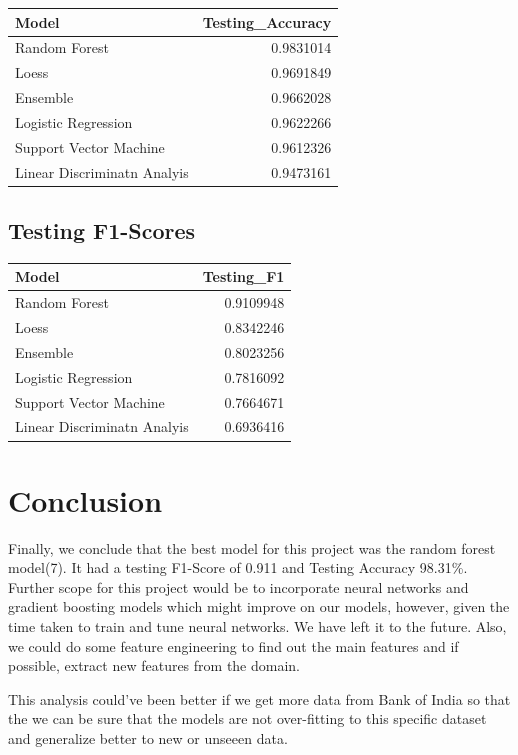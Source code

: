 \documentclass[
]{article}
\newenvironment{Shaded}{\begin{snugshade}}{\end{snugshade}}
\newcommand{\CommentTok}[1]{\textcolor[rgb]{0.00,0.40,1.00}{\textbf{\textit{#1}}}}
\newcommand{\DataTypeTok}[1]{\textcolor[rgb]{0.74,0.68,0.62}{\underline{#1}}}
\newcommand{\KeywordTok}[1]{\textcolor[rgb]{0.26,0.66,0.93}{\textbf{#1}}}
\newcommand{\NormalTok}[1]{\textcolor[rgb]{0.74,0.68,0.62}{#1}}
\newcommand{\OperatorTok}[1]{\textcolor[rgb]{0.74,0.68,0.62}{#1}}
\newcommand{\StringTok}[1]{\textcolor[rgb]{0.02,0.61,0.04}{#1}}
\begin{document}
\begin{longtable}[]{@{}lr@{}}
\toprule
Model & Testing\_Accuracy\tabularnewline
\midrule
\endhead
Random Forest & 0.9831014\tabularnewline
Loess & 0.9691849\tabularnewline
Ensemble & 0.9662028\tabularnewline
Logistic Regression & 0.9622266\tabularnewline
Support Vector Machine & 0.9612326\tabularnewline
Linear Discriminatn Analyis & 0.9473161\tabularnewline
\bottomrule
\end{longtable}

\hypertarget{testing-f1-scores}{%
\subsection{Testing F1-Scores}\label{testing-f1-scores}}

\begin{Shaded}
\end{Shaded}

\begin{longtable}[]{@{}lr@{}}
\toprule
Model & Testing\_F1\tabularnewline
\midrule
\endhead
Random Forest & 0.9109948\tabularnewline
Loess & 0.8342246\tabularnewline
Ensemble & 0.8023256\tabularnewline
Logistic Regression & 0.7816092\tabularnewline
Support Vector Machine & 0.7664671\tabularnewline
Linear Discriminatn Analyis & 0.6936416\tabularnewline
\bottomrule
\end{longtable}

\pagebreak

\hypertarget{conclusion}{%
\section{Conclusion}\label{conclusion}}

Finally, we conclude that the best model for this project was the random
forest model(7). It had a testing F1-Score of 0.911 and Testing Accuracy
98.31\%.\\
Further scope for this project would be to incorporate neural networks
and gradient boosting models which might improve on our models, however,
given the time taken to train and tune neural networks. We have left it
to the future. Also, we could do some feature engineering to find out
the main features and if possible, extract new features from the domain.

This analysis could've been better if we get more data from Bank of
India so that the we can be sure that the models are not over-fitting to
this specific dataset and generalize better to new or unseeen data.
\end{document}
